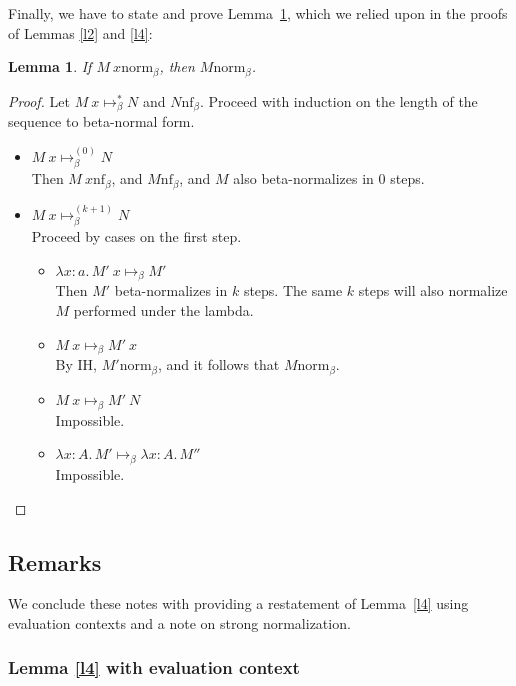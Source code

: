 \documentclass{article}
\newtheorem{lem}[thm]{Lemma}
\newcommand{\bnf}[1]{#1 \mathrel{\text{nf}_\beta}}
\newcommand{\bnorm}[1]{\ensuremath{#1 \mathrel{\text{norm}_\beta}}}
\newcommand{\stepb}[2]{\ensuremath{#1 \mapsto_{\beta} #2}}
\newcommand{\stepbs}[2]{\ensuremath{#1 \mapsto_{\beta}^* #2}}
\newcommand{\stepbk}[3]{\ensuremath{#1 \mapsto_{\beta}^{(#2)} #3}}
\newcommand{\ap}[2]{\ensuremath{#1\ #2}}
\newcommand{\lam}[3]{\ensuremath{\lambda #1 {:} #2.\, #3}}
\begin{document}
Finally, we have to state and prove Lemma~\ref{l6}, which we relied upon in the proofs of
Lemmas \ref{l2} and \ref{l4}:

\begin{lem}\label{l6}
If \bnorm{\ap{M}{x}}, then \bnorm{M}.
\end{lem}

\begin{proof}
Let $\stepbs{\ap{M}{x}}{N}$ and $\bnf{N}$.
Proceed with induction on the length of the sequence to beta-normal form.
\begin{itemize}
  \setlength\itemsep{1em}
  \item $\stepbk{\ap{M}{x}}{0}{N}$\\
  Then $\bnf{\ap{M}{x}}$, and $\bnf{M}$, and $M$ also beta-normalizes in 0 steps. 
  \item $\stepbk{\ap{M}{x}}{k+1}{N}$\\
  Proceed by cases on the first step.
  \begin{itemize}
  \setlength\itemsep{1em}
  \item \stepb{\ap{\lam{x}{a}{M'}}{x}}{M'}\\
  Then $M'$ beta-normalizes in $k$ steps. The same $k$ steps will also normalize $M$ performed under the lambda.
  \item \stepb{\ap{M}{x}}{\ap{M'}{x}}\\
  By IH, \bnorm{M'}, and it follows that $\bnorm{M}$.
  \item \stepb{\ap{M}{x}}{\ap{M'}{N}}\\
  Impossible.
  \item \stepb{\lam{x}{A}{M'}}{\lam{x}{A}{M''}}\\
  Impossible.
  \end{itemize}
  
\end{itemize}
\end{proof}

\subsection{Remarks}

We conclude these notes with providing a restatement of Lemma~\ref{l4} using evaluation
contexts and a note on strong normalization.

\subsubsection{Lemma \ref{l4} with evaluation context}
\end{document}
